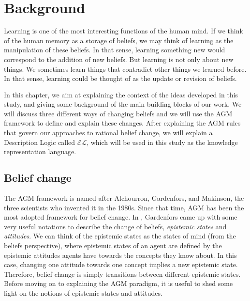 \chapter{Background}
\label{background}
Learning is one of the most interesting functions of the human mind. If we think of the human memory as a storage of beliefs, we may think of learning as the manipulation of these beliefs. In that sense, learning something new would correspond to the addition of new beliefs. But learning is not only about new things. We sometimes learn things that contradict other things we learned before. In that sense, learning could be thought of as the update or revision of beliefs. 

In this chapter, we aim at explaining the context of the ideas developed in this study, and giving some background of the main building blocks of our work. We will discuss three different ways of changing beliefs and we will use the AGM framework\cite{kr} to define and explain these changes. After explaining the AGM rules that govern our approaches to rational belief change, we will explain a Description Logic called $\mathcal{EL}$, which will be used in this study as the knowledge representation language.

\section{Belief change}
The AGM framework is named after Alchourron, Gardenfors, and Makinson, the three scientists who invented it in the 1980s. Since that time, AGM has been the most adopted framework for belief change. In \cite{flux}, Gardenfors came up with some very useful notations to describe the change of beliefs, \textit{epistemic states} and \textit{attitudes}. We can think of the epistemic states as the states of mind (from the beliefs perspective), where epistemic states of an agent are defined by the epistemic attitudes agents have towards the concepts they know about. In this case, changing one attitude towards one concept implies a new epistemic state. Therefore, belief change is simply transitions between different epistemic states. Before moving on to explaining the AGM paradigm, it is useful to shed some light on the notions of epistemic states and attitudes.

